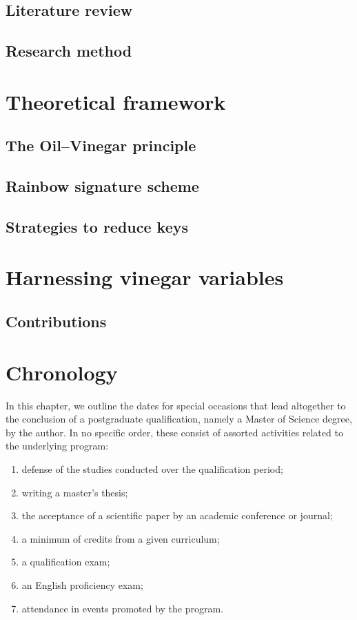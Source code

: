 \documentclass[openright]{report}
\begin{document}
\section{Literature review}

\section{Research method}

\chapter{Theoretical framework}

\section{The Oil--Vinegar principle}

\section{Rainbow signature scheme}

\section{Strategies to reduce keys}

\chapter{Harnessing vinegar variables}

\section{Contributions}

\chapter{Chronology}

In this chapter, we outline the dates for special occasions that lead altogether to the conclusion of a postgraduate qualification, namely a Master of Science degree, by the author. In no specific order, these consist of assorted activities related to the underlying program:

\begin{enumerate}[label=(\roman*)]
  \setlength\itemsep{1pt}
  \item\label{enum:0} defense of the studies conducted over the qualification period;
  \item\label{enum:1} writing a master's thesis;
  \item\label{enum:2} the acceptance of a scientific paper by an academic conference or journal;
  \item\label{enum:3} a minimum of credits from a given curriculum;
  \item\label{enum:4} a qualification exam;
  \item\label{enum:5} an English proficiency exam;
  \item\label{enum:6} attendance in events promoted by the program. 
\end{enumerate}
\end{document}
